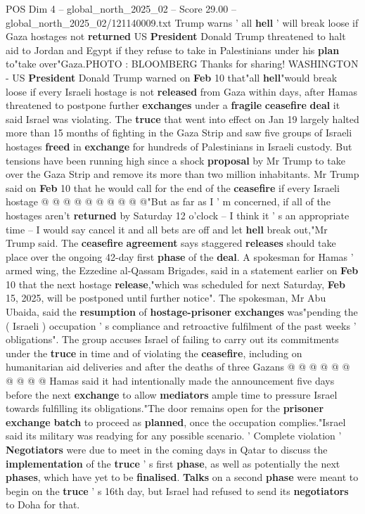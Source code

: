 \begin{textsample}{POS Dim 4 – global\_north\_2025\_02 – Score 29.00 – global\_north\_2025\_02/121140009.txt}  \label{ex:f4_pos_054}
Trump warns ' all \textbf{hell} ' will break loose if Gaza hostages not \textbf{returned} US \textbf{President} Donald Trump threatened to halt aid to Jordan and Egypt if they refuse to take in Palestinians under his \textbf{plan} to"take over"Gaza.PHOTO : BLOOMBERG Thanks for sharing!
WASHINGTON - US \textbf{President} Donald Trump warned on \textbf{Feb} 10 that"all \textbf{hell}"would break loose if every Israeli hostage is not \textbf{released} from Gaza within days, after Hamas threatened to postpone further \textbf{exchanges} under a \textbf{fragile} \textbf{ceasefire} \textbf{deal} it said Israel was violating.
The \textbf{truce} that went into effect on Jan 19 largely halted more than 15 months of fighting in the Gaza Strip and saw five groups of Israeli hostages \textbf{freed} in \textbf{exchange} for hundreds of Palestinians in Israeli custody.
But tensions have been running high since a shock \textbf{proposal} by Mr Trump to take over the Gaza Strip and remove its more than two million inhabitants.
Mr Trump said on \textbf{Feb} 10 that he would call for the end of the \textbf{ceasefire} if every Israeli hostage @ @ @ @ @ @ @ @ @ @"But as far as I ' m concerned, if all of the hostages aren't \textbf{returned} by Saturday 12 o'clock -- I think it ' s an appropriate time -- I would say cancel it and all bets are off and let \textbf{hell} break out,"Mr Trump said.
The \textbf{ceasefire} \textbf{agreement} says staggered \textbf{releases} should take place over the ongoing 42-day first \textbf{phase} of the \textbf{deal}.
A spokesman for Hamas ' armed wing, the Ezzedine al-Qassam Brigades, said in a statement earlier on \textbf{Feb} 10 that the next hostage \textbf{release},"which was scheduled for next Saturday, \textbf{Feb} 15, 2025, will be postponed until further notice".
The spokesman, Mr Abu Ubaida, said the \textbf{resumption} of \textbf{hostage-prisoner} \textbf{exchanges} was"pending the ( Israeli ) occupation ' s compliance and retroactive fulfilment of the past weeks ' obligations".
The group accuses Israel of failing to carry out its commitments under the \textbf{truce} in time and of violating the \textbf{ceasefire}, including on humanitarian aid deliveries and after the deaths of three Gazans @ @ @ @ @ @ @ @ @ @ Hamas said it had intentionally made the announcement five days before the next \textbf{exchange} to allow \textbf{mediators} ample time to pressure Israel towards fulfilling its obligations."The door remains open for the \textbf{prisoner} \textbf{exchange} \textbf{batch} to proceed as \textbf{planned}, once the occupation complies."Israel said its military was readying for any possible scenario. ' Complete violation ' \textbf{Negotiators} were due to meet in the coming days in Qatar to discuss the \textbf{implementation} of the \textbf{truce} ' s first \textbf{phase}, as well as potentially the next \textbf{phases}, which have yet to be \textbf{finalised}. \textbf{Talks} on a second \textbf{phase} were meant to begin on the \textbf{truce} ' s 16th day, but Israel had refused to send its \textbf{negotiators} to Doha for that.

\end{textsample}
